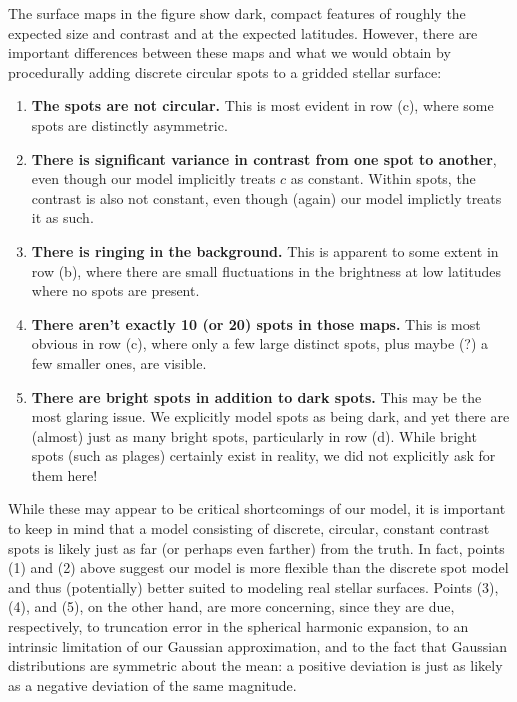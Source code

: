 \documentclass[modern]{aastex62}
\begin{document}
The surface maps in the figure show dark, compact features of roughly the expected
size and contrast and at the expected latitudes. However, there are important
differences between these maps and what we would obtain by procedurally adding discrete
circular spots to a gridded stellar surface:
%
\begin{enumerate}
    \item \textbf{The spots are not circular.} This is most evident in row (c),
          where some spots are distinctly asymmetric.
    \item \textbf{There is significant variance in contrast from one spot to another},
          even though our model
          implicitly treats $c$ as constant. Within spots, the contrast is also
          not constant, even though (again) our model implictly treats it as such.
    \item \textbf{There is ringing in the background.} This is apparent to some extent in
          row (b), where there are small fluctuations in the brightness at low
          latitudes where no spots are present.
    \item \textbf{There aren't exactly 10 (or 20) spots in those maps.} This is
          most obvious in row (c), where only a few large distinct spots,
          plus maybe (?) a few smaller ones, are visible.
    \item \textbf{There are bright spots in addition to dark spots.} This may be
          the most glaring issue. We explicitly model spots as being dark, and yet
          there are (almost) just as many bright spots, particularly in row (d).
          While bright spots (such as plages) certainly exist in reality, we did not
          explicitly ask for them here!
\end{enumerate}
%
While these may appear to be critical shortcomings of our model, it is
important to keep in mind that a model consisting of discrete, circular, constant
contrast spots is likely just as far (or perhaps even farther) from the truth. In fact,
points (1) and (2) above suggest our model is more flexible than the discrete
spot model and thus (potentially) better suited to modeling real stellar surfaces.
Points (3), (4), and (5), on the other hand, are more concerning, since they are due,
respectively, to truncation error in the spherical harmonic expansion,
to an intrinsic limitation of our Gaussian approximation,
and to the fact that Gaussian distributions are symmetric about the mean: a positive
deviation is just as likely as a negative deviation of the same magnitude.%
\end{document}
